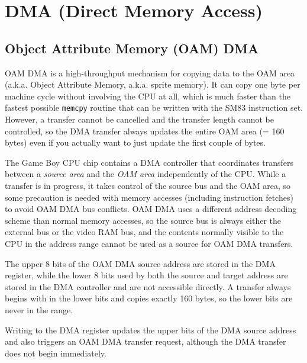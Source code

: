 
\chapter{DMA (Direct Memory Access)}

\section{Object Attribute Memory (OAM) DMA}

OAM DMA is a high-throughput mechanism for copying data to the OAM area (a.k.a.
Object Attribute Memory, a.k.a. sprite memory). It can copy one byte per
machine cycle without involving the CPU at all, which is much faster than the
fastest possible \texttt{memcpy} routine that can be written with the SM83
instruction set. However, a transfer cannot be cancelled and the transfer
length cannot be controlled, so the DMA transfer always updates the entire OAM
area (= 160 bytes) even if you actually want to just update the first couple of
bytes.

The Game Boy CPU chip contains a DMA controller that coordinates transfers
between a \emph{source area} and the \emph{OAM area} independently of the CPU.
While a transfer is in progress, it takes control of the source bus and the OAM
area, so some precaution is needed with memory accesses (including instruction
fetches) to avoid OAM DMA bus conflicts. OAM DMA uses a different address
decoding scheme than normal memory accesses, so the source bus is always either
the external bus or the video RAM bus, and the contents normally visible to the
CPU in the  address range cannot be used as a source for
OAM DMA transfers.

The upper 8 bits of the OAM DMA source address are stored in the DMA register,
while the lower 8 bits used by both the source and target address are stored in
the DMA controller and are not accessible directly. A transfer always begins
with  in the lower bits and copies exactly 160 bytes, so the lower bits
are never in the  range.

Writing to the DMA register updates the upper bits of the DMA source address
and also triggers an OAM DMA transfer request, although the DMA transfer does
not begin immediately.

